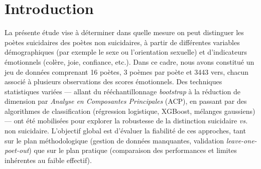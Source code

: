 \section{Introduction}
\label{sec:introduction}

La présente étude vise à déterminer dans quelle mesure on peut distinguer 
les poètes suicidaires des poètes non suicidaires, à partir de différentes 
variables démographiques (par exemple le sexe ou l’orientation sexuelle) 
et d’indicateurs émotionnels (colère, joie, confiance, etc.). Dans ce cadre, 
nous avons constitué un jeu de données comprenant 16 poètes, 3 poèmes par poète et 3443 vers, chacun associé 
à plusieurs observations des scores émotionnels. Des techniques 
statistiques variées — allant du rééchantillonnage \emph{bootstrap} à la 
réduction de dimension par \emph{Analyse en Composantes Principales} (ACP), 
en passant par des algorithmes de classification (régression logistique, 
XGBoost, mélanges gaussiens) — ont été mobilisées pour explorer la robustesse 
de la distinction suicidaire \emph{vs.} non suicidaire. L’objectif global est 
d’évaluer la fiabilité de ces approches, tant sur le plan méthodologique 
(gestion de données manquantes, validation \emph{leave-one-poet-out}) que 
sur le plan pratique (comparaison des performances et limites inhérentes 
au faible effectif).